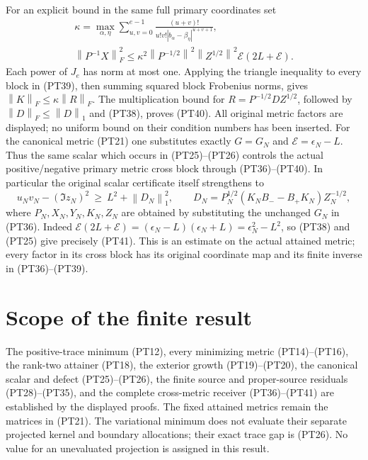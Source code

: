 \documentclass[11pt,a4paper]{article}
\providecommand{\norm}[1]{\left\lVert#1\right\rVert}
\begin{document}
For an explicit bound in the same full primary coordinates set
\begin{equation}\tag{PT40}
 \begin{gathered}
 \kappa=\max_{\alpha,\eta}
       \sum_{u,v=0}^{e-1}
       \frac{(u+v)!}{u!v!|b_\alpha-\beta_\eta|^{u+v+1}},\\
 \norm{P^{-1}X}_F^2
 \le\kappa^2\norm{P^{-1/2}}^2\norm{Z^{1/2}}^2
                  \mathcal E(2L+\mathcal E).
 \end{gathered}
\end{equation}
Each power of \(J_e\) has norm at most one. Applying the triangle
inequality to every block in (PT39), then summing squared block
Frobenius norms, gives \(\norm K_F\le\kappa\norm R_F\).
The multiplication bound for \(R=P^{-1/2}DZ^{1/2}\), followed
by \(\norm D_F\le\norm D_1\) and (PT38), proves (PT40).
All original metric factors are displayed; no uniform bound on
their condition numbers has been inserted.
For the canonical metric (PT21) one substitutes exactly
\(G=G_N\) and \(\mathcal E=\epsilon_N-L\). Thus the same
scalar which occurs in (PT25)--(PT26) controls the actual
positive/negative primary metric cross block through (PT36)--(PT40).
In particular the original scalar certificate itself strengthens to
\begin{equation}\tag{PT41}
 u_Nv_N-(\Im z_N)^2\ \ge\ L^2+\norm{D_N}_1^2,
 \qquad
 D_N=P_N^{1/2}(K_NB_--B_+K_N)Z_N^{-1/2},
\end{equation}
where \(P_N,X_N,Y_N,K_N,Z_N\) are obtained by substituting
the unchanged \(G_N\) in (PT36). Indeed
\(\mathcal E(2L+\mathcal E)=(\epsilon_N-L)
(\epsilon_N+L)=\epsilon_N^2-L^2\), so (PT38) and (PT25)
give precisely (PT41). This is an estimate on the actual attained
metric; every factor in its cross block has its original coordinate
map and its finite inverse in (PT36)--(PT39).

\section{Scope of the finite result}

The positive-trace minimum (PT12), every minimizing metric
(PT14)--(PT16), the rank-two attainer (PT18), the exterior growth
(PT19)--(PT20), the canonical scalar and defect (PT25)--(PT26),
the finite source and proper-source residuals (PT28)--(PT35),
and the complete cross-metric receiver (PT36)--(PT41)
are established by the displayed proofs. The fixed attained
metrics remain the matrices in (PT21). The variational minimum
does not evaluate their separate projected kernel and boundary
allocations; their exact trace gap is (PT26). No value for an
unevaluated projection is assigned in this result.
\end{document}
